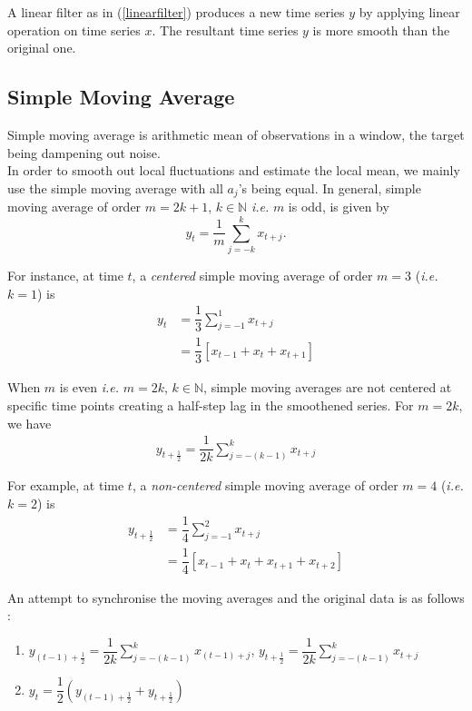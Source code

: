 \documentclass[11pt, a4paper]{article}
\numberwithin{equation}{section}
\theoremstyle{definition}
\begin{document}
A linear filter as in (\ref{linearfilter}) produces a new time series $y$ by applying linear operation on time series $x$. The resultant time series $y$ is more smooth than the original one.

\subsection{Simple Moving Average}

Simple moving average is arithmetic mean of observations in a window, the target being dampening out noise. \\[0.25em]

In order to smooth out local fluctuations and estimate the local mean, we mainly use the simple moving average with all $a_j$'s being equal. In general, simple moving average of order $m = 2k + 1$, $k \in \mathbb{N}$ \textit{i.e.} $m$ is odd, is given by
\begin{equation}
y_t = \dfrac{1}{m} \sum \limits_{j = -k}^{k} x_{t+j}.
\end{equation}

For instance, at time $t$, a \textit{centered} simple moving average of order $m = 3$ (\textit{i.e.} $k = 1$) is
\begin{align*}
y_t &= \dfrac{1}{3} \sum \limits_{j = -1}^{1} x_{t+j} \\[0.25em]
&= \dfrac{1}{3} \left[ x_{t-1} + x_t + x_{t+1} \right]
\end{align*}

When $m$ is even \textit{i.e.} $m = 2k$, $k \in \mathbb{N}$, simple moving averages are not centered at specific time points creating a half-step lag in the smoothened series. For $m = 2k$, we have
\begin{align*}
y_{t + \frac{1}{2}} = \dfrac{1}{2k} \sum \limits_{j = -(k-1)}^{k} x_{t+j}
\end{align*}

For example, at time $t$, a \textit{non-centered} simple moving average of order $m = 4$ (\textit{i.e.} $k = 2$) is
\begin{align*}
y_{t + \frac{1}{2}} &= \dfrac{1}{4} \sum \limits_{j = -1}^{2} x_{t+j} \\[0.25em]
&= \dfrac{1}{4} \left[ x_{t-1} + x_t + x_{t+1} + x_{t+2} \right]
\end{align*}

An attempt to synchronise the moving averages and the original data is as follows :
\begin{enumerate}[Step I :]
\item $y_{(t-1) + \frac{1}{2}} = \dfrac{1}{2k} \sum \limits_{j = -(k-1)}^{k} x_{(t-1)+j}$, $y_{t + \frac{1}{2}} = \dfrac{1}{2k} \sum \limits_{j = -(k-1)}^{k} x_{t+j}$
\item $y_t = \dfrac{1}{2} \left(y_{(t-1) + \frac{1}{2}} +  y_{t + \frac{1}{2}}\right)$

\end{enumerate}
\end{document}
